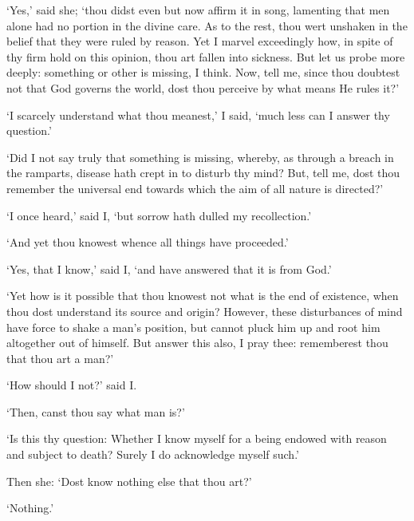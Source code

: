 \documentclass[12pt]{book}
\begin{document}
`Yes,' said she; `thou didst even but now affirm it in song, lamenting
that men alone had no portion in the divine care. As to the rest, thou
wert unshaken in the belief that they were ruled by reason. Yet I
marvel exceedingly how, in spite of thy firm hold on this opinion, thou
art fallen into sickness. But let us probe more deeply: something or
other is missing, I think. Now, tell me, since thou doubtest not that
God governs the world, dost thou perceive by what means He rules it?'

`I scarcely understand what thou meanest,' I said, `much less can I
answer thy question.'

`Did I not say truly that something is missing, whereby, as through a
breach in the ramparts, disease hath crept in to disturb thy mind? But,
tell me, dost thou remember the universal end towards which the aim of
all nature is directed?'

`I once heard,' said I, `but sorrow hath dulled my recollection.'

`And yet thou knowest whence all things have proceeded.'

`Yes, that I know,' said I, `and have answered that it is from God.'

`Yet how is it possible that thou knowest not what is the end of
existence, when thou dost understand its source and origin? However,
these disturbances of mind have force to shake a man's position, but
cannot pluck him up and root him altogether out of himself. But answer
this also, I pray thee: rememberest thou that thou art a man?'

`How should I not?' said I.

`Then, canst thou say what man is?'

`Is this thy question: Whether I know myself for a being endowed with
reason and subject to death? Surely I do acknowledge myself such.'

Then she: `Dost know nothing else that thou art?'

`Nothing.'
\end{document}
